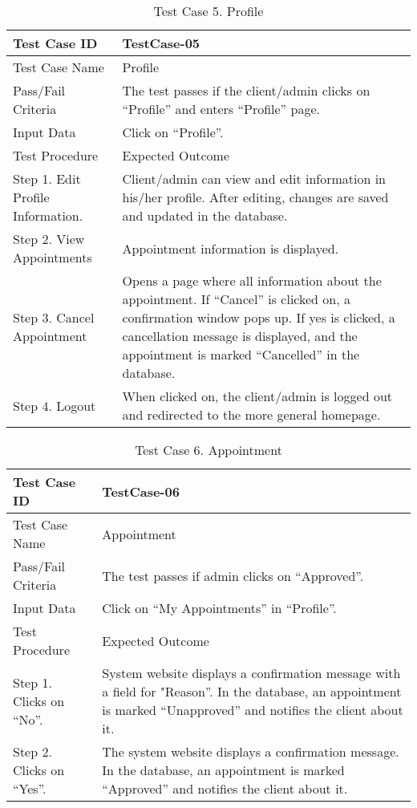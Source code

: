 \begin{table}[h!]   %
\centering
\caption{Test Case 5. Profile} \vspace{0.25em}
\begin{tabular}{|p{2in}|p{4in}|} \hline
\centering 
Test Case ID & TestCase-05 \\ \hline
Test Case Name       &   Profile     \\ \hline
Pass/Fail Criteria       &   The test passes if the client/admin clicks on “Profile” and enters “Profile” page.     \\ \hline
Input Data  & Click on “Profile”.   \\ \hline
Test Procedure   & Expected Outcome  \\ \hline
Step 1. Edit Profile Information.         &   Client/admin can view and edit information in his/her profile. After editing, changes are saved and updated in the database.     \\ \hline
Step 2. View Appointments     & Appointment information is displayed.    \\ \hline
Step 3. Cancel Appointment   & Opens a page where all information about the appointment. If “Cancel” is clicked on, a confirmation window pops up. If yes is clicked, a cancellation message is displayed, and the appointment is marked “Cancelled” in the database.   \\ \hline
Step 4. Logout   & When clicked on, the client/admin is logged out and redirected to the more general homepage.    \\ \hline
\end{tabular}
\label{tab:test5}
\end{table}

\newpage
\begin{table}[h!]   %
\centering
\caption{Test Case 6. Appointment} \vspace{0.25em}
\begin{tabular}{|p{2in}|p{4in}|} \hline
\centering 
Test Case ID & TestCase-06 \\ \hline
Test Case Name       &   Appointment     \\ \hline
Pass/Fail Criteria       &   The test passes if admin clicks on “Approved”.  \\ \hline
Input Data  & Click on “My Appointments” in “Profile”.    \\ \hline
Test Procedure   & Expected Outcome  \\ \hline
Step 1. Clicks on “No”.          &   System website displays a confirmation message with a field for "Reason”. 
In the database, an appointment is marked “Unapproved” and notifies the client about it.      \\ \hline
Step 2. Clicks on “Yes”.    & 	The system website displays a confirmation message. In the database, an appointment is marked “Approved” and notifies the client about it.      \\ \hline
\end{tabular}
\label{tab:test6}
\end{table}



